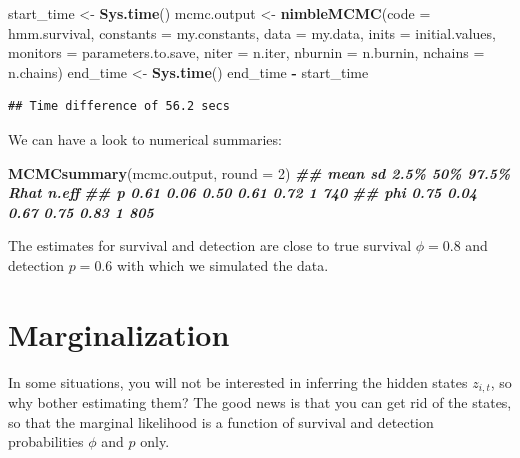 \documentclass[
  12pt,
]{krantz}
\newenvironment{Shaded}{\begin{snugshade}}{\end{snugshade}}
\newcommand{\AttributeTok}[1]{\textcolor[rgb]{0.13,0.29,0.53}{#1}}
\newcommand{\DecValTok}[1]{\textcolor[rgb]{0.00,0.00,0.81}{#1}}
\newcommand{\DocumentationTok}[1]{\textcolor[rgb]{0.56,0.35,0.01}{\textbf{\textit{#1}}}}
\newcommand{\FunctionTok}[1]{\textcolor[rgb]{0.13,0.29,0.53}{\textbf{#1}}}
\newcommand{\NormalTok}[1]{#1}
\newcommand{\OtherTok}[1]{\textcolor[rgb]{0.56,0.35,0.01}{#1}}
\newcommand{\SpecialCharTok}[1]{\textcolor[rgb]{0.81,0.36,0.00}{\textbf{#1}}}
\begin{document}
\begin{Shaded}
\begin{Highlighting}[]
\NormalTok{start\_time }\OtherTok{\textless{}{-}} \FunctionTok{Sys.time}\NormalTok{()}
\NormalTok{mcmc.output }\OtherTok{\textless{}{-}} \FunctionTok{nimbleMCMC}\NormalTok{(}\AttributeTok{code =}\NormalTok{ hmm.survival,}
                          \AttributeTok{constants =}\NormalTok{ my.constants,}
                          \AttributeTok{data =}\NormalTok{ my.data,}
                          \AttributeTok{inits =}\NormalTok{ initial.values,}
                          \AttributeTok{monitors =}\NormalTok{ parameters.to.save,}
                          \AttributeTok{niter =}\NormalTok{ n.iter,}
                          \AttributeTok{nburnin =}\NormalTok{ n.burnin,}
                          \AttributeTok{nchains =}\NormalTok{ n.chains)}
\NormalTok{end\_time }\OtherTok{\textless{}{-}} \FunctionTok{Sys.time}\NormalTok{()}
\NormalTok{end\_time }\SpecialCharTok{{-}}\NormalTok{ start\_time}
\end{Highlighting}
\end{Shaded}

\begin{verbatim}
## Time difference of 56.2 secs
\end{verbatim}

We can have a look to numerical summaries:

\begin{Shaded}
\begin{Highlighting}[]
\FunctionTok{MCMCsummary}\NormalTok{(mcmc.output, }\AttributeTok{round =} \DecValTok{2}\NormalTok{)}
\DocumentationTok{\#\#     mean   sd 2.5\%  50\% 97.5\% Rhat n.eff}
\DocumentationTok{\#\# p   0.61 0.06 0.50 0.61  0.72    1   740}
\DocumentationTok{\#\# phi 0.75 0.04 0.67 0.75  0.83    1   805}
\end{Highlighting}
\end{Shaded}

The estimates for survival and detection are close to true survival \(\phi = 0.8\) and detection \(p = 0.6\) with which we simulated the data.

\section{Marginalization}\label{marginalization}

In some situations, you will not be interested in inferring the hidden states \(z_{i,t}\), so why bother estimating them? The good news is that you can get rid of the states, so that the marginal likelihood is a function of survival and detection probabilities \(\phi\) and \(p\) only.
\end{document}
